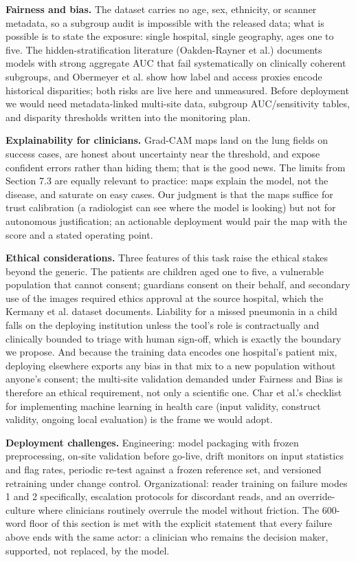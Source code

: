 \documentclass[11pt,a4paper]{article}
\begin{document}
\textbf{Fairness and bias.} The dataset carries no age, sex, ethnicity, or scanner metadata, so a subgroup audit is impossible with the released data; what is possible is to state the exposure: single hospital, single geography, ages one to five. The hidden-stratification literature (Oakden-Rayner et al.) documents models with strong aggregate AUC that fail systematically on clinically coherent subgroups, and Obermeyer et al. show how label and access proxies encode historical disparities; both risks are live here and unmeasured. Before deployment we would need metadata-linked multi-site data, subgroup AUC/sensitivity tables, and disparity thresholds written into the monitoring plan.

\textbf{Explainability for clinicians.} Grad-CAM maps land on the lung fields on success cases, are honest about uncertainty near the threshold, and expose confident errors rather than hiding them; that is the good news. The limits from Section 7.3 are equally relevant to practice: maps explain the model, not the disease, and saturate on easy cases. Our judgment is that the maps suffice for trust calibration (a radiologist can see where the model is looking) but not for autonomous justification; an actionable deployment would pair the map with the score and a stated operating point.

\textbf{Ethical considerations.} Three features of this task raise the ethical stakes beyond the generic. The patients are children aged one to five, a vulnerable population that cannot consent; guardians consent on their behalf, and secondary use of the images required ethics approval at the source hospital, which the Kermany et al. dataset documents. Liability for a missed pneumonia in a child falls on the deploying institution unless the tool's role is contractually and clinically bounded to triage with human sign-off, which is exactly the boundary we propose. And because the training data encodes one hospital's patient mix, deploying elsewhere exports any bias in that mix to a new population without anyone's consent; the multi-site validation demanded under Fairness and Bias is therefore an ethical requirement, not only a scientific one. Char et al.'s checklist for implementing machine learning in health care (input validity, construct validity, ongoing local evaluation) is the frame we would adopt.

\textbf{Deployment challenges.} Engineering: model packaging with frozen preprocessing, on-site validation before go-live, drift monitors on input statistics and flag rates, periodic re-test against a frozen reference set, and versioned retraining under change control. Organizational: reader training on failure modes 1 and 2 specifically, escalation protocols for discordant reads, and an override-culture where clinicians routinely overrule the model without friction. The 600-word floor of this section is met with the explicit statement that every failure above ends with the same actor: a clinician who remains the decision maker, supported, not replaced, by the model.
\end{document}
